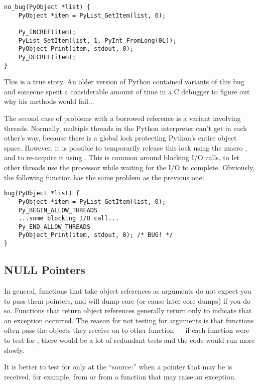 \begin{verbatim}
no_bug(PyObject *list) {
    PyObject *item = PyList_GetItem(list, 0);

    Py_INCREF(item);
    PyList_SetItem(list, 1, PyInt_FromLong(0L));
    PyObject_Print(item, stdout, 0);
    Py_DECREF(item);
}
\end{verbatim}

This is a true story.  An older version of Python contained variants
of this bug and someone spent a considerable amount of time in a C
debugger to figure out why his  methods would fail...

The second case of problems with a borrowed reference is a variant
involving threads.  Normally, multiple threads in the Python
interpreter can't get in each other's way, because there is a global
lock protecting Python's entire object space.  However, it is possible
to temporarily release this lock using the macro
, and to re-acquire it using
.  This is common around blocking I/O
calls, to let other threads use the processor while waiting for the I/O to
complete.  Obviously, the following function has the same problem as
the previous one:

\begin{verbatim}
bug(PyObject *list) {
    PyObject *item = PyList_GetItem(list, 0);
    Py_BEGIN_ALLOW_THREADS
    ...some blocking I/O call...
    Py_END_ALLOW_THREADS
    PyObject_Print(item, stdout, 0); /* BUG! */
}
\end{verbatim}


\subsection{NULL Pointers
            \label{nullPointers}}

In general, functions that take object references as arguments do not
expect you to pass them \NULL{} pointers, and will dump core (or
cause later core dumps) if you do so.  Functions that return object
references generally return \NULL{} only to indicate that an
exception occurred.  The reason for not testing for \NULL{}
arguments is that functions often pass the objects they receive on to
other function --- if each function were to test for \NULL,
there would be a lot of redundant tests and the code would run more
slowly.

It is better to test for \NULL{} only at the ``source:'' when a
pointer that may be \NULL{} is received, for example, from
 or from a function that may raise an exception.

